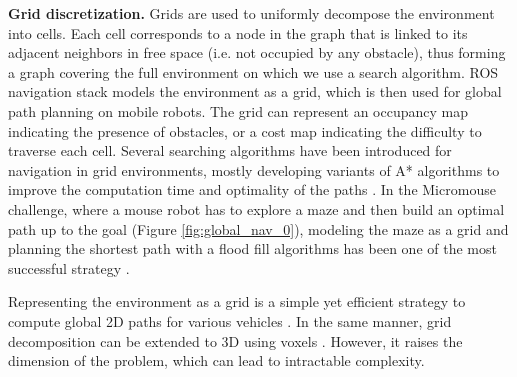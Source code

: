 \noindent\textbf{Grid discretization.}
Grids are used to uniformly decompose the environment into cells. 
Each cell corresponds to a node in the graph that is linked to its adjacent neighbors in free space (i.e. not occupied by any obstacle), thus forming a graph covering the full environment on which we use a search algorithm.
ROS navigation stack \cite{ROS_software} models the environment as a grid, which is then used for global path planning on mobile robots. The grid can represent an occupancy map indicating the presence of obstacles, or a cost map indicating the difficulty to traverse each cell.
Several searching algorithms have been introduced for navigation in grid environments, mostly developing variants of A* algorithms to improve the computation time and optimality of the paths \cite{Philippsen_2005, grid_duchon_2014}.
In the Micromouse challenge, where a mouse robot has to explore a maze and then build an optimal path up to the goal (Figure \ref{fig:global_nav_0}), modeling the maze as a grid and planning the shortest path with a flood fill algorithms has been one of the most successful strategy \cite{micromouse_mishra_2008, micromouse_Benavides2018}.

Representing the environment as a grid is a simple yet efficient strategy to compute global 2D paths for various vehicles \cite{car_grid_ferguson_2008, singh_boat_grid_2018, saeed_grid_2020}.
In the same manner, grid decomposition can be extended to 3D using voxels \cite{3d_field_voxel_carsten_2006, uav_aerial_perez_grau_voxel_2017}. However, it raises the dimension of the problem, which can lead to intractable complexity.\\


